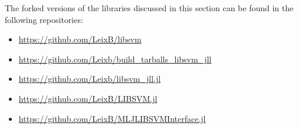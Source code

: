 The forked versions of the libraries discussed in this section can be found in the following
repositories:
\begin{itemize}
    \item \url{https://github.com/LeixB/libsvm}
    \item \url{https://github.com/Leixb/build\_tarballs\_libsvm\_jll}
    \item \url{https://github.com/Leixb/libsvm\_jll.jl}
    \item \url{https://github.com/LeixB/LIBSVM.jl}
    \item \url{https://github.com/LeixB/MLJLIBSVMInterface.jl}
\end{itemize}


